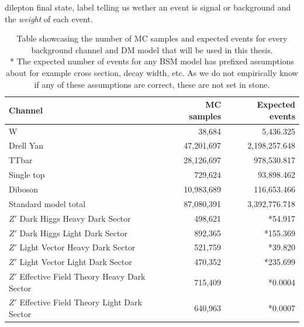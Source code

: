 \documentclass[14pt, a4paper]{book}
\begin{document}
dilepton final state, label telling us wether an event is signal or background and the \textit{weight} of each event.
\begin{table}[!h]
   \centering
    \caption[Dataset used for ML]{Table showcasing the number of MC samples and expected events for every background channel and DM model that will be used in this thesis.\\ * The expected number of events for any BSM model has prefixed assumptions about for example 
      cross section, decay width, etc. As we do not empirically know if any of these assumptions are correct, these are not set in stone.}
   \begin{tabular}{l|r|r}\midrule\midrule
      Channel                                                                         & MC samples            & Expected events  \\\midrule
      W                                                                               & 38,684                & 5,436.325        \\
      Drell Yan                                                                       & 47,201,697            & 2,198,257.648    \\
      TTbar                                                                           & 28,126,697            & 978,530.817      \\
      Single top                                                                      & 729,624               & 93,898.462       \\
      Diboson                                                                         & 10,983,689            & 116,653.466      \\\midrule
      Standard model total                                                            & 87,080,391            & 3,392,776.718    \\\midrule
      $Z'$ Dark Higgs Heavy Dark Sector                                               & 498,621               & *54.917         \\
      $Z'$ Dark Higgs Light Dark Sector                                               & 892,365               & *155.369         \\
      $Z'$ Light Vector Heavy Dark Sector                                             & 521,759               & *39.820         \\
      $Z'$ Light Vector Light Dark Sector                                             & 470,352               & *235.699         \\
      $Z'$ Effective Field Theory Heavy Dark Sector                                   & 715,409               & *0.0004           \\
      $Z'$ Effective Field Theory Light Dark Sector                                   & 640,963               & *0.0007          \\\midrule\midrule
   \end{tabular}
   \label{tab:dataset}
\end{table}
\end{document}
